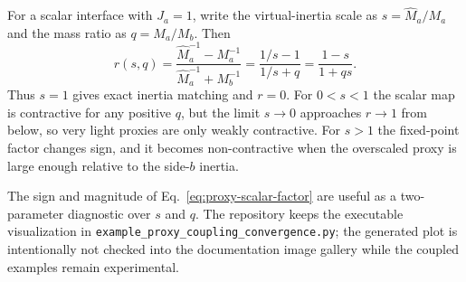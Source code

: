\documentclass[11pt]{article}
\newcommand{\Ja}{J_a}
\newcommand{\Ma}{M_a}
\newcommand{\Mb}{M_b}
\newcommand{\Mhat}{\widehat M_a}
\begin{document}
For a scalar interface with $\Ja=1$, write the virtual-inertia scale as
$s=\Mhat/\Ma$ and the mass ratio as $q=\Ma/\Mb$. Then
\begin{equation}
    r(s,q)
    =
    \frac{\Mhat^{-1}-\Ma^{-1}}{\Mhat^{-1}+\Mb^{-1}}
    =
    \frac{1/s-1}{1/s+q}
    =
    \frac{1-s}{1+qs}.
    \label{eq:proxy-scalar-factor}
\end{equation}
Thus $s=1$ gives exact inertia matching and $r=0$. For $0<s<1$ the scalar map is
contractive for any positive $q$, but the limit $s\to0$ approaches $r\to1$ from
below, so very light proxies are only weakly contractive. For $s>1$ the fixed-point
factor changes sign, and it becomes non-contractive when the overscaled proxy is large
enough relative to the side-$b$ inertia.

The sign and magnitude of Eq.~\eqref{eq:proxy-scalar-factor} are useful as a
two-parameter diagnostic over $s$ and $q$.  The repository keeps the executable
visualization in \texttt{example\_proxy\_coupling\_convergence.py}; the generated
plot is intentionally not checked into the documentation image gallery while
the coupled examples remain experimental.
\end{document}
